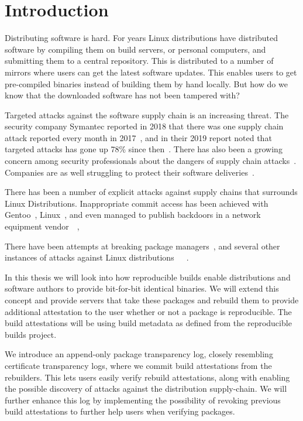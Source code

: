 \documentclass[../Main/thesis.tex]{subfiles}
\begin{document}
\chapter{Introduction}\label{ch:introduction}
Distributing software is hard. For years Linux distributions have distributed
software by compiling them on build servers, or personal computers, and
submitting them to a central repository. This is distributed to a number of
mirrors where users can get the latest software updates. This enables users to
get pre-compiled binaries instead of building them by hand locally. But how do
we know that the downloaded software has not been tampered with?

Targeted attacks against the software supply chain is an increasing threat.
The security company Symantec reported in 2018 that there was one supply chain
attack reported every month in 2017~\cite{symantec-istr-2018}, and in their 2019
report noted that targeted attacks has gone up 78\% since
then~\cite{symantec-istr-2019}. There has also been a growing concern among
security professionals about the dangers of supply chain
attacks~\cite{crowdstrike-supply-chain-attacks}. Companies are as well
struggling to protect their software deliveries~\cite{cd-pipelines-case-study}.

There has been a number of explicit attacks against supply chains that surrounds
Linux Distributions. Inappropriate commit access has been achieved with
Gentoo~\cite{gentoo-compromise-2018}, Linux~\cite{linux-compromise-2011}, and
even managed to publish backdoors in a network equipment
vendor~\cite{Checkoway:2016:SAJ:2976749.2978395}~\cite{juniper-backdoor-advisory},

There have been attempts at breaking package
managers~\cite{Cappos:2008:LMA:1455770.1455841}, and several other instances of
attacks against Linux
distributions~\cite{gentoo-compromise-2003}~\cite{fedora-compromise-2011}~\cite{fedora-compromise-2008}.

In this thesis we will look into how reproducible builds enable distributions
and software authors to provide bit-for-bit identical binaries. We will extend
this concept and provide servers that take these packages and rebuild them to
provide additional attestation to the user whether or not a package is
reproducible. The build attestations will be using build metadata as defined
from the reproducible builds project.

We introduce an append-only package transparency log, closely resembling
certificate transparency logs, where we commit build attestations from the
rebuilders. This lets users easily verify rebuild attestations, along with
enabling the possible discovery of attacks against the distribution
supply-chain. We will further enhance this log by implementing the possibility
of revoking previous build attestations to further help users when verifying
packages.
\end{document}
